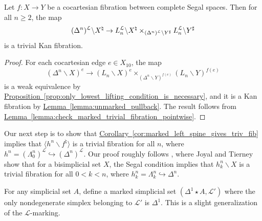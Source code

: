 \documentclass[main.tex]{subfiles}
\begin{document}
\begin{corollary}
  \label{cor:marked_left_spine_gives_triv_fib}
  Let $f\colon X \to Y$ be a cocartesian fibration between complete Segal spaces. Then for all $n \geq 2$, the map
  \begin{equation*}
    (\Delta^{n})^{\mathcal{L}} \backslash X^{\natural} \to L_{n}^{\mathcal{L}} \backslash X^{\natural} \times_{(\Delta^{n})^{\mathcal{L}} \backslash Y^{\sharp}} L_{n}^{\mathcal{L}} \backslash Y^{\sharp}
  \end{equation*}
  is a trivial Kan fibration.
\end{corollary}
\begin{proof}
  For each cocartesian edge $e \in X_{10}$, the map
  \begin{equation*}
    (\Delta^{n} \backslash X)^{e} \to (L_{n} \backslash X)^{e} \times_{(\Delta^{n} \backslash Y)^{f(e)}} (L_{n} \backslash Y)^{f(e)}
  \end{equation*}
  is a weak equivalence by \hyperref[prop:only_lowest_lifting_condition_is_necessary]{Proposition~\ref*{prop:only_lowest_lifting_condition_is_necessary}}, and it is a Kan fibration by \hyperref[lemma:unmarked_pullback]{Lemma~\ref*{lemma:unmarked_pullback}}. The result follows from \hyperref[lemma:check_marked_trivial_fibration_pointwise]{Lemma~\ref*{lemma:check_marked_trivial_fibration_pointwise}}.
\end{proof}

Our next step is to show that \hyperref[cor:marked_left_spine_gives_triv_fib]{Corollary~\ref*{cor:marked_left_spine_gives_triv_fib}} implies that $\langle h^{n} \backslash f^{\natural} \rangle$ is a trivial fibration for all $n$, where $h^{n} = (\Lambda^{n}_{0})^{\mathcal{L}} \hookrightarrow (\Delta^{n})^{\mathcal{L}}$. Our proof roughly follows \cite{qcats_vs_segal_spaces}, where Joyal and Tierney show that for a bisimplicial set $X$, the Segal condition implies that $h^{n}_{k} \backslash X$ is a trivial fibration for all $0 < k < n$, where $h^{n}_{k} = \Lambda^{n}_{k} \hookrightarrow \Delta^{n}$.

For any simplicial set $A$, define a marked simplicial set $(\Delta^{1} \star A, \mathcal{L'})$ where the only nondegenerate simplex belonging to $\mathcal{L}'$ is $\Delta^{1}$. This is a slight generalization of the $\mathcal{L}$-marking.
\end{document}
